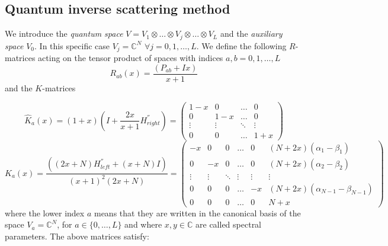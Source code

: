 \documentclass[10pt]{article}
\numberwithin{equation}{section}
\numberwithin{equation}{subsection}
\begin{document}
\subsection{Quantum inverse scattering method}\label{SubsectionQISM}
 We introduce the \textit{quantum space} $V=V_{1}\otimes\ldots\otimes V_{j}\otimes\ldots\otimes V_{L}$ and the \textit{auxiliary space} $V_{0}$. In this specific case $V_{j}=\mathbb{C}^{N}$ $\forall j=0,1,\ldots ,L$. We define the following $R$-matrices acting on the tensor product of spaces with indices $a,b=0,1,\ldots,L$
\begin{equation}\label{Rmatrix}
	R_{ab}(x)=\frac{(P_{ab}+Ix)}{x+1}
\end{equation}
and the $K$-matrices

\begin{equation}\label{KmatrixHAT}
	\widehat{K}_{a}(x)=(1+x)\left(I+\frac{2x}{x+1}H^{''}_{right}\right)=\begin{pmatrix}
		1-x&0&\ldots&0\\
		0&1-x&\ldots&0\\
		\vdots&\vdots&\ddots&\vdots\\
		0&0&\ldots&1+x
	\end{pmatrix}
\end{equation}
\begin{equation}\label{Kmatrix}
	K_{a}(x)=\frac{\left((2x+N)H^{''}_{left}+(x+N)I\right)}{(x+1)^{2}(2x+N)}=\begin{pmatrix}
		-x&0&0&\ldots&0&(N+2x)(\alpha_{1}-\beta_{1})\\
		0&-x&0&\ldots&0&(N+2x)(\alpha_{2}-\beta_{2})\\
		\vdots&\vdots&\ddots&\vdots&\vdots&\vdots\\
		0&0&0&\ldots&-x&(N+2x)(\alpha_{N-1}-\beta_{N-1})\\
		0&0&0&\ldots&0&N+x
	\end{pmatrix}
\end{equation}
where the lower index $a$ means that they are written in the canonical basis of the space $V_{a}=\mathbb{C}^{N}$, for $a\in\{0,\ldots,L\}$ and where $x,y\in\mathbb{C}$ are called spectral parameters.  
The above matrices satisfy:
\end{document}
